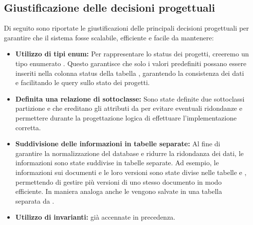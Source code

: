 \documentclass{report}
\begin{document}
\subsection{Giustificazione delle decisioni progettuali}
Di seguito sono riportate le giustificazioni delle principali decisioni progettuali per garantire che il sistema fosse scalabile, efficiente e facile da mantenere:
\begin{itemize}
\item \textbf{Utilizzo di tipi enum:} Per rappresentare lo status dei progetti, creeremo un tipo enumerato . Questo garantisce che solo i valori predefiniti possano essere inseriti nella colonna status della tabella , garantendo la consistenza dei dati e facilitando le query sullo stato dei progetti.

\item \textbf{Definita una relazione di sottoclasse:} Sono state definite due sottoclassi partizione  e  che ereditano gli attributi da  per evitare eventuali ridondanze e permettere durante la progettazione logica di effettuare l'implementazione corretta.

\item \textbf{Suddivisione delle informazioni in tabelle separate:} Al fine di garantire la normalizzazione del database e ridurre la ridondanza dei dati, le informazioni sono state suddivise in tabelle separate. Ad esempio, le informazioni sui documenti e le loro versioni sono state divise nelle tabelle  e , permettendo di gestire più versioni di uno stesso documento in modo efficiente. In maniera analoga anche le  vengono salvate in una tabella separata da .

\item \textbf{Utilizzo di invarianti:} già accennate in precedenza.

\end{itemize}
\end{document}
